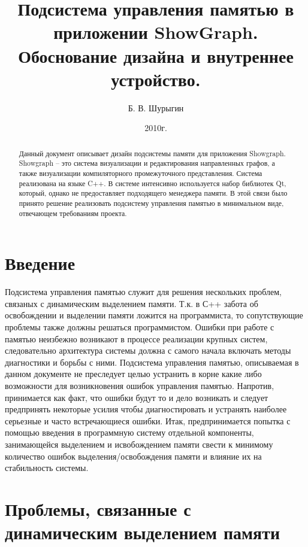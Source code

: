 \documentclass{article}
\begin{document}
 
\lstset{language=[Visual]C++}

\title{Подсистема управления памятью в приложении ShowGraph.\\Обоснование дизайна и внутреннее устройство.}
\author{Б. В. Шурыгин}
\date{2010г.}

\maketitle
\begin{abstract}
Данный документ описывает дизайн подсистемы памяти для приложения Showgraph.  Showgraph -- это система визуализации и редактирования направленных графов, а также визуализации компиляторного промежуточного представления. Система реализована на языке C++. В системе интенсивно используется набор библиотек Qt, который, однако не предоставляет подходящего менеджера памяти. В этой связи было принято решение реализовать подсистему управления памятью в минимальном виде, отвечающем требованиям проекта.
\end{abstract}

\tableofcontents
\section{Введение}
Подсистема управления памятью служит для решения нескольких проблем, связаных с динамическим выделением памяти. Т.к. в С++ забота об освобождении и выделении памяти ложится на программиста, то сопутствующие проблемы также должны решаться программистом. Ошибки при работе с памятью неизбежно возникают в процессе реализации крупных систем, следовательно архитектура системы должна с самого начала включать методы диагностики и борьбы с ними. Подсистема управления памятью, описываемая в данном документе не преследует целью устранить в корне какие либо возможности для возникновения ошибок управления памятью. Напротив, принимается как факт, что ошибки будут то и дело возникать и следует предпринять некоторые усилия чтобы диагностировать и устранять наиболее серьезные и часто встречающиеся ошибки. Итак, предпринимается попытка с помощью введения в программную систему отдельной компоненты, занимающейся выделением и исвобождением памяти свести к минимому количество ошибок выделения/освобождения памяти и влияние их на стабильность системы.

\section{Проблемы, связанные с динамическим выделением памяти}
\end{document}
